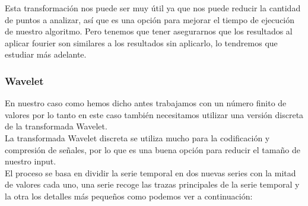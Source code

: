\documentclass[12pt,a4paper]{article}
\begin{document}
			Esta transformación nos puede ser muy útil ya que nos puede reducir la cantidad de puntos a analizar, así que es una opción para mejorar el tiempo de ejecución de nuestro algoritmo. Pero tenemos que tener asegurarnos que los resultados al aplicar fourier son similares a los resultados sin aplicarlo, lo tendremos que estudiar más adelante.
			
			\subsubsection{Wavelet}
			En nuestro caso como hemos dicho antes trabajamos con un número finito de valores por lo tanto en este caso también necesitamos utilizar una versión discreta de la transformada Wavelet.\\
			La transformada Wavelet discreta  se utiliza mucho para la codificación y compresión de señales, por lo que es una buena opción para reducir el tamaño de nuestro input.\\
			El proceso se basa en dividir la serie temporal en dos nuevas series con la mitad de valores cada uno, una serie recoge las trazas principales de la serie temporal y la otra los detalles más pequeños como podemos ver a continuación:\\
\end{document}

